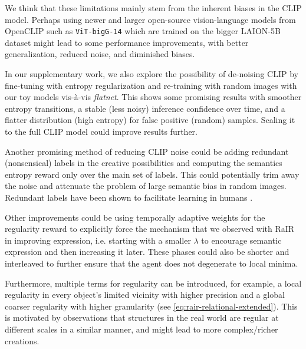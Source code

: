 
We think that these limitations mainly stem from the inherent biases in the CLIP model.
Perhaps using newer and larger open-source vision-language models from OpenCLIP such as \texttt{ViT-bigG-14} \citep{openclip} which are trained on the bigger LAION-5B dataset \citep{laion5b} might lead to some performance improvements, with better generalization, reduced noise, and diminished biases.

In our supplementary work, we also explore the possibility of de-noising CLIP by fine-tuning with entropy regularization and re-training with random images with our toy models vis-\`a-vis \emph{flatnet}.
This shows some promising results with smoother entropy transitions, a stable (less noisy) inference confidence over time, and a flatter distribution (high entropy) for false positive (random) samples.
Scaling it to the full CLIP model could improve results further.

Another promising method of reducing CLIP noise could be adding redundant (nonsensical) labels in the creative possibilities and computing the semantics entropy reward only over the main set of labels.
This could potentially trim away the noise and attenuate the problem of large semantic bias in random images.
Redundant labels have been shown to facilitate learning in humans \citep{redundant_labels}.

Other improvements could be using temporally adaptive weights for the regularity reward to explicitly force the mechanism that we observed with RaIR in improving expression, i.e. starting with a smaller \(\lambda\) to encourage semantic expression and then increasing it later.
These phases could also be shorter and interleaved to further ensure that the agent does not degenerate to local minima.

Furthermore, multiple terms for regularity can be introduced, for example, a local regularity in every object's limited vicinity with higher precision and a global coarser regularity with higher granularity (see \eqref{eq:rair-relational-extended}).
This is motivated by observations that structures in the real world are regular at different scales in a similar manner, and might lead to more complex/richer creations.

